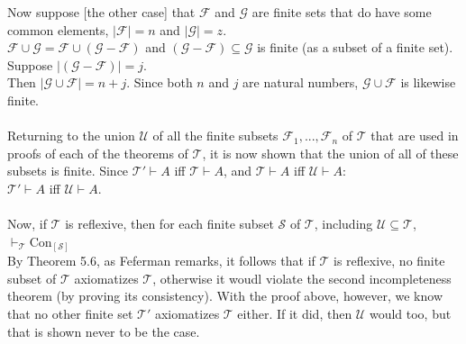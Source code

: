 \documentclass{article}
\begin{document}
Now suppose [the other case] that $\mathcal{F}$ and $\mathcal{G}$ are finite sets that do have some common elements, $\mid\mathcal{F}\mid = n$ and $\mid\mathcal{G}\mid = z$.\\
$\mathcal{F} \cup \mathcal{G} = \mathcal{F} \cup (\mathcal{G} - \mathcal{F})$ and  $(\mathcal{G} - \mathcal{F}) \subseteq \mathcal{G}$ is finite (as a subset of a finite set). Suppose $\mid(\mathcal{G} - \mathcal{F})\mid = j$.\\
Then $\mid\mathcal{G} \cup \mathcal{F}\mid = n+j$. Since both $n$ and $j$ are natural numbers, $\mathcal{G} \cup \mathcal{F}$ is likewise finite.\\\\
Returning to the union $\mathcal{U}$ of all the finite subsets $\mathcal{F}_1, ..., \mathcal{F}_n$ of $\mathcal{T}$ that are used in proofs of each of the theorems of $\mathcal{T}$, it is now shown that the union of all of these subsets is finite. Since $\mathcal{T'}\vdash A$ iff $\mathcal{T}\vdash A$, and $\mathcal{T}\vdash A$ iff $\mathcal{U}\vdash A$:\\
$\mathcal{T'}\vdash A$ iff $\mathcal{U}\vdash A$.\\\\
Now, if $\mathcal{T}$ is reflexive, then for each finite subset $\mathcal{S}$ of $\mathcal{T}$, including $\mathcal{U} \subseteq \mathcal{T}$,\\

$\vdash_{\mathscr{T}} $Con$_{\mathcal{[S]}}$\\
By Theorem 5.6, as Feferman remarks, it follows that if $\mathcal{T}$ is reflexive, no finite subset of $\mathcal{T}$ axiomatizes $\mathcal{T}$, otherwise it woudl violate the second incompleteness theorem (by proving its consistency). With the proof above, however, we know that no other finite set $\mathcal{T'}$ axiomatizes $\mathcal{T}$ either. If it did, then $\mathcal{U}$ would too, but that is shown never to be the case.
\end{document}
